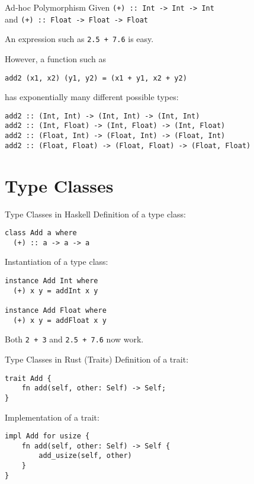 \documentclass[
  english,            %
  aspectratio=169,    %
]{tumbeamer}
\begin{document}
\begin{frame}[fragile]{Ad-hoc Polymorphism}
Given \texttt{(+) :: Int -> Int -> Int} \\
and \texttt{(+) :: Float -> Float -> Float} \pause \vspace{3mm}

An expression such as \texttt{2.5 + 7.6} is easy. \pause \vspace{3mm}

However, a function such as
\begin{verbatim}
add2 (x1, x2) (y1, y2) = (x1 + y1, x2 + y2)
\end{verbatim}
\pause has exponentially many different possible types: \vspace{3mm}

\begin{verbatim}
add2 :: (Int, Int) -> (Int, Int) -> (Int, Int)
add2 :: (Int, Float) -> (Int, Float) -> (Int, Float)
add2 :: (Float, Int) -> (Float, Int) -> (Float, Int)
add2 :: (Float, Float) -> (Float, Float) -> (Float, Float)
\end{verbatim}
\end{frame}

\section{Type Classes}

\begin{frame}[fragile]{Type Classes in Haskell}
Definition of a type class:
\begin{verbatim}
class Add a where
  (+) :: a -> a -> a
\end{verbatim}

\pause \vspace{3mm}

Instantiation of a type class:
\begin{verbatim}
instance Add Int where
  (+) x y = addInt x y

instance Add Float where
  (+) x y = addFloat x y
\end{verbatim}

\pause \vspace{3mm}

Both \texttt{2 + 3} and \texttt{2.5 + 7.6} now work.
\end{frame}

\begin{frame}[fragile]{Type Classes in Rust (Traits)}
Definition of a trait:
\begin{verbatim}
trait Add {
    fn add(self, other: Self) -> Self;
}
\end{verbatim}

\pause \vspace{3mm}

Implementation of a trait:
\begin{verbatim}
impl Add for usize {
    fn add(self, other: Self) -> Self {
        add_usize(self, other)
    }
}
\end{verbatim}
\end{frame}
\end{document}
